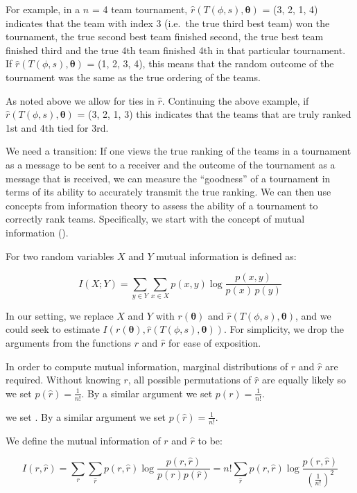 \documentclass[
  12pt]{article}
\begin{document}
For example, in a \(n\) = 4 team tournament,
\(\hat{r}(T(\phi, s),\boldsymbol{\theta})\) = (3, 2, 1, 4) indicates
that the team with index 3 (i.e.~the true third best team) won the
tournament, the true second best team finished second, the true best
team finished third and the true 4th team finished 4th in that
particular tournament. If \(\hat{r}(T(\phi, s),\boldsymbol{\theta})\) =
(1, 2, 3, 4), this means that the random outcome of the tournament was
the same as the true ordering of the teams.

As noted above we allow for ties in \(\hat{r}\). Continuing the above
example, if \(\hat{r}(T(\phi, s),\boldsymbol{\theta})\) = (3, 2, 1, 3)
this indicates that the teams that are truly ranked 1st and 4th tied for
3rd.

We need a transition: If one views the true ranking of the teams in a
tournament as a message to be sent to a receiver and the outcome of the
tournament as a message that is received, we can measure the
``goodness'' of a tournament in terms of its ability to accurately
transmit the true ranking. We can then use concepts from information
theory to assess the ability of a tournament to correctly rank teams.
Specifically, we start with the concept of mutual information
(\citet{Guiasu1977-nu}).

For two random variables \(X\) and \(Y\) mutual information is defined
as:

\[
I(X;Y)=\sum_{y\in Y}\sum_{x\in X}p(x,y)\log \frac {p(x,y)}{p(x)\,p(y)}
\]

In our setting, we replace \(X\) and \(Y\) with
\(r(\boldsymbol{\theta})\) and
\(\hat{r}(T(\phi, s),\boldsymbol{\theta})\), and we could seek to
estimate
\(I(r(\boldsymbol{\theta}),\hat{r}(T(\phi, s),\boldsymbol{\theta}))\).
For simplicity, we drop the arguments from the functions \(r\) and
\(\hat{r}\) for ease of exposition.

In order to compute mutual information, marginal distributions of \(r\)
and \(\hat{r}\) are required. Without knowing \(r\), all possible
permutations of \(\hat{r}\) are equally likely so we set
\(p(\hat{r}) = \frac{1}{n!}\). By a similar argument we set
\(p(r) = \frac{1}{n!}\).

we set . By a similar argument we set \(p(\hat{r}) = \frac{1}{n!}\).

We define the mutual information of \(r\) and \(\hat{r}\) to be:

\[
I(r,\hat{r})=\sum_{r}\sum_{\hat{r}}p(r,\hat{r})\log \frac {p(r,\hat{r})}{p(r)p(\hat{r})} = n!\sum_{\hat{r}}p(r,\hat{r})\log \frac {p(r,\hat{r})}{(\frac{1}{n!})^2}
\]
\end{document}
